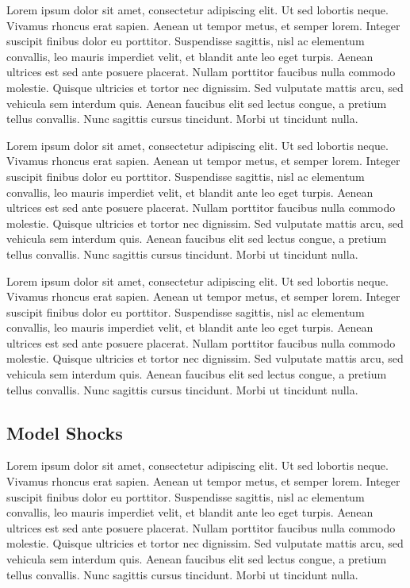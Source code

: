 Lorem ipsum dolor sit amet, consectetur adipiscing elit. Ut sed lobortis neque. Vivamus rhoncus erat sapien. Aenean ut tempor metus, et semper lorem. Integer suscipit finibus dolor eu porttitor. Suspendisse sagittis, nisl ac elementum convallis, leo mauris imperdiet velit, et blandit ante leo eget turpis. Aenean ultrices est sed ante posuere placerat. Nullam porttitor faucibus nulla commodo molestie. Quisque ultricies et tortor nec dignissim. Sed vulputate mattis arcu, sed vehicula sem interdum quis. Aenean faucibus elit sed lectus congue, a pretium tellus convallis. Nunc sagittis cursus tincidunt. Morbi ut tincidunt nulla.

Lorem ipsum dolor sit amet, consectetur adipiscing elit. Ut sed lobortis neque. Vivamus rhoncus erat sapien. Aenean ut tempor metus, et semper lorem. Integer suscipit finibus dolor eu porttitor. Suspendisse sagittis, nisl ac elementum convallis, leo mauris imperdiet velit, et blandit ante leo eget turpis. Aenean ultrices est sed ante posuere placerat. Nullam porttitor faucibus nulla commodo molestie. Quisque ultricies et tortor nec dignissim. Sed vulputate mattis arcu, sed vehicula sem interdum quis. Aenean faucibus elit sed lectus congue, a pretium tellus convallis. Nunc sagittis cursus tincidunt. Morbi ut tincidunt nulla.

Lorem ipsum dolor sit amet, consectetur adipiscing elit. Ut sed lobortis neque. Vivamus rhoncus erat sapien. Aenean ut tempor metus, et semper lorem. Integer suscipit finibus dolor eu porttitor. Suspendisse sagittis, nisl ac elementum convallis, leo mauris imperdiet velit, et blandit ante leo eget turpis. Aenean ultrices est sed ante posuere placerat. Nullam porttitor faucibus nulla commodo molestie. Quisque ultricies et tortor nec dignissim. Sed vulputate mattis arcu, sed vehicula sem interdum quis. Aenean faucibus elit sed lectus congue, a pretium tellus convallis. Nunc sagittis cursus tincidunt. Morbi ut tincidunt nulla.

\subsection{Model Shocks}
Lorem ipsum dolor sit amet, consectetur adipiscing elit. Ut sed lobortis neque. Vivamus rhoncus erat sapien. Aenean ut tempor metus, et semper lorem. Integer suscipit finibus dolor eu porttitor. Suspendisse sagittis, nisl ac elementum convallis, leo mauris imperdiet velit, et blandit ante leo eget turpis. Aenean ultrices est sed ante posuere placerat. Nullam porttitor faucibus nulla commodo molestie. Quisque ultricies et tortor nec dignissim. Sed vulputate mattis arcu, sed vehicula sem interdum quis. Aenean faucibus elit sed lectus congue, a pretium tellus convallis. Nunc sagittis cursus tincidunt. Morbi ut tincidunt nulla.


